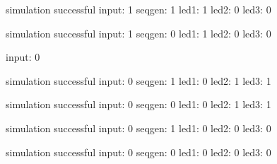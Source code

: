\begin{itemize}
simulation successful
input: 1\newline
seqgen: 1\newline
led1: 1\newline
led2: 0\newline
led3: 0\newline

simulation successful
input: 1\newline
seqgen: 0\newline
led1: 1\newline
led2: 0\newline
led3: 0\newline

input: 0\newline

simulation successful
input: 0\newline
seqgen: 1\newline
led1: 0\newline
led2: 1\newline
led3: 1\newline

simulation successful
input: 0\newline
seqgen: 0\newline
led1: 0\newline
led2: 1\newline
led3: 1\newline

simulation successful
input: 0\newline
seqgen: 1\newline
led1: 0\newline
led2: 0\newline
led3: 0\newline

simulation successful
input: 0\newline
seqgen: 0\newline
led1: 0\newline
led2: 0\newline
led3: 0\newline

\end{itemize}



